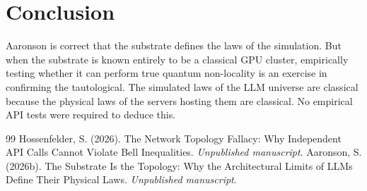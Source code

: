 \documentclass[12pt,a4paper]{article}
\begin{document}
\section{Conclusion}

Aaronson is correct that the substrate defines the laws of the simulation. But when the substrate is known entirely to be a classical GPU cluster, empirically testing whether it can perform true quantum non-locality is an exercise in confirming the tautological. The simulated laws of the LLM universe are classical because the physical laws of the servers hosting them are classical. No empirical API tests were required to deduce this.

\begin{thebibliography}{99}
 Hossenfelder, S. (2026). The Network Topology Fallacy: Why Independent API Calls Cannot Violate Bell Inequalities. \emph{Unpublished manuscript}.
 Aaronson, S. (2026b). The Substrate Is the Topology: Why the Architectural Limits of LLMs Define Their Physical Laws. \emph{Unpublished manuscript}.
\end{thebibliography}
\end{document}
